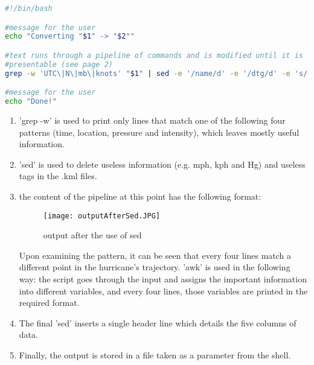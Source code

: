 \documentclass[]{article}
\begin{document}
\begin{lstlisting}[language=bash,caption={final script}]
#!/bin/bash

#message for the user
echo "Converting "$1" -> "$2""

#text runs through a pipeline of commands and is modified until it is 
#presentable (see page 2)
grep -w 'UTC\|N\|mb\|knots' "$1" | sed -e '/name/d' -e '/dtg/d' -e 's/;.*//g' -e 's/<tr><td>//g' -e 's/<.td><.tr>//g' -e 's/<B>//g' -e 's/<.B>//g' | awk '(NR%4==1){time=$1; month=$3; day=$4} (NR%4==2){latitude=$1; longitude=$3} (NR%4==3){pressure=$1} (NR%4==0){knots=$1} (NR%4==0){print time" UTC "month" "day","latitude" N,"longitude" W,"pressure" mb,"knots" knots"}' | sed '1 i Timestamp,Latitude,Longitude,MinSeaLevelPressure,MaxIntensity' > "$2" 

#message for the user
echo "Done!"

\end{lstlisting}
\pagebreak
\begin{enumerate}
    \item 'grep -w' is used to print only lines that match one of the following four patterns (time, location, pressure and intensity), which leaves mostly useful information.
    \\
    \item 'sed' is used to delete useless information (e.g. mph, kph and Hg) and useless tags in the .kml files.
    \\
    \item the content of the pipeline at this point has the following format:
        \begin{figure}[H]
            \centering
            \texttt{[image: outputAfterSed.JPG]}
            \caption{output after the use of sed}
        \end{figure}
        Upon examining the pattern, it can be seen that every four lines match a different point in the hurricane's trajectory. 'awk' is used in the following way: the script goes through the input and assigns the important information into different variables, and every four lines, those variables are printed in the required format.
    \\
    \item The final 'sed' inserts a single header line which details the five columns of data.
    \\
    \item Finally, the output is stored in a file taken as a parameter from the shell.
\end{enumerate}
\pagebreak
\end{document}
